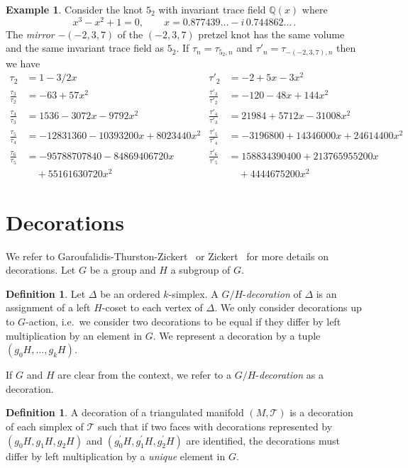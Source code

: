 \documentclass[12pt]{amsart}
\theoremstyle{definition}
\newtheorem{definition}[theorem]{Definition}
\newtheorem{example}[theorem]{Example}
\numberwithin{equation}{section}
\def\BQ{\mathbb Q}
\begin{document}
\begin{example}
\label{ex:52.1loop}
Consider the knot $5_2$ with invariant trace field $\BQ(x)$ where
$$
x^3-x^2+1=0, \qquad x=0.877439 \dots -i \, 0.744862 \dots \,.
$$
The {\em mirror} $-(-2,3,7)$ of the $(-2,3,7)$ pretzel knot has the same volume
and the same invariant trace field as $5_2$.  
If $\tau_n=\tau_{5_2,n}$ and $\tau'_n=\tau_{-(-2,3,7),n}$ 
then we have
{\small
\begin{align*}
\tau_2 &= 1-3/2 x &
\tau'_2 &= -2 + 5  x -3  x^2
\\
\frac{\tau_3}{\tau_2} &= -63+ 57 x^2 &
\frac{\tau'_3}{\tau'_2} &= -120 -48  x + 144  x^2
\\
\frac{\tau_4}{\tau_3} &= 1536 -3072 x -9792 x^2 &
\frac{\tau'_4}{\tau'_3} &= 21984 + 5712  x -31008  x^2
\\
\frac{\tau_5}{\tau_4} &= -12831360 -10393200 x +  8023440 x^2 &
\frac{\tau'_5}{\tau'_4} &= -3196800 + 14346000  x +  24614400  x^2
\\
\frac{\tau_6}{\tau_5} &= -95788707840 -84869406720 x  &
\frac{\tau'_6}{\tau'_5} &= 158834390400 + 213765955200 x 
\\
 & \quad + 55161630720 x^2 & & \quad + 4444675200 x^2
\end{align*}
}
\end{example}


\section{Decorations}\label{sec:Decorations}
We refer to Garoufalidis-Thurston-Zickert~\cite{GaroufalidisThurstonZickert} or Zickert~\cite{ZickertDuke} for more details on decorations.
Let $G$ be a group and $H$ a subgroup of $G$.
\begin{definition}\label{def:Decoration}
Let $\Delta$ be an ordered $k$-simplex. A $G/H$-\emph{decoration} of $\Delta$ is an assignment of a left $H$-coset to each vertex of $\Delta$. We only consider decorations up to $G$-action, i.e.~we consider two decorations to be equal if they differ by left multiplication by an element in $G$.
We represent a decoration by a tuple $(g_0H,\dots,g_kH)$.
\end{definition}
If $G$ and $H$ are clear from the context, we refer to a $G/H$-\emph{decoration} as a decoration.
\begin{definition} A decoration of a triangulated manifold $(M,\mathcal T)$ is a decoration of each simplex of $\mathcal T$ such that if two faces with decorations represented by $(g_0H,g_1H,g_2H)$ and $(g_0^\prime H,g_1^\prime H,g_2^\prime H)$ are identified, the decorations must differ by left multiplication by a \emph{unique} element in $G$.
\end{definition}
\end{document}
